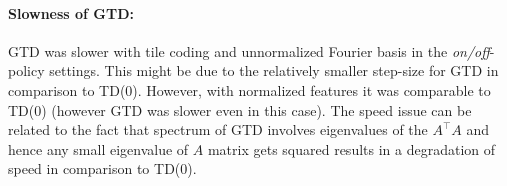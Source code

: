  \paragraph{Slowness of GTD:}  GTD was slower with tile coding and unnormalized Fourier basis in the \emph{on/off}-policy settings. This might be due to the relatively smaller step-size for GTD in comparison to TD(0). However, with normalized features it was comparable to TD(0) (however GTD was slower even in this case). The speed issue can be related to the fact that spectrum of GTD involves eigenvalues of the $A^\top A$  and hence any small eigenvalue of $A$ matrix gets squared results in a degradation of speed in comparison to TD(0).

\begin{table}
\label{tab:step-size}
\caption{step-size choices for the \emph{on/off}-policy settings in the mountain car experiment. The same step-size rule was followed for TD as well as GTD. Notice that these step-size choices directly follow from the results in  without any further tuning.}
\end{table}
%
